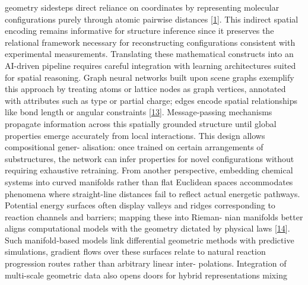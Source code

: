 \documentclass[
]{article}
\begin{document}
geometry sidesteps direct reliance on coordinates by representing
molecular configurations purely through atomic pairwise distances
{[}\protect\hyperlink{_bookmark41}{1}{]}. This indirect spatial encoding
remains informative for structure inference since it preserves the
relational framework necessary for reconstructing configurations
consistent with experimental measurements. Translating these
mathematical constructs into an AI-driven pipeline requires careful
integration with learning architectures suited for spatial reasoning.
Graph neural networks built upon scene graphs exemplify this approach by
treating atoms or lattice nodes as graph vertices, annotated with
attributes such as type or partial charge; edges encode spatial
relationships like bond length or angular constraints
{[}\protect\hyperlink{_bookmark53}{13}{]}. Message-passing mechanisms
propagate information across this spatially grounded structure until
global properties emerge accurately from local interactions. This design
allows compositional gener- alisation: once trained on certain
arrangements of substructures, the network can infer properties for
novel configurations without requiring exhaustive retraining. From
another perspective, embedding chemical systems into curved manifolds
rather than flat Euclidean spaces accommodates phenomena where
straight-line distances fail to reflect actual energetic pathways.
Potential energy surfaces often display valleys and ridges corresponding
to reaction channels and barriers; mapping these into Rieman- nian
manifolds better aligns computational models with the geometry dictated
by physical laws {[}\protect\hyperlink{_bookmark54}{14}{]}. Such
manifold-based models link differential geometric methods with
predictive simulations, gradient flows over these surfaces relate to
natural reaction progression routes rather than arbitrary linear inter-
polations. Integration of multi-scale geometric data also opens doors
for hybrid representations mixing
\end{document}

